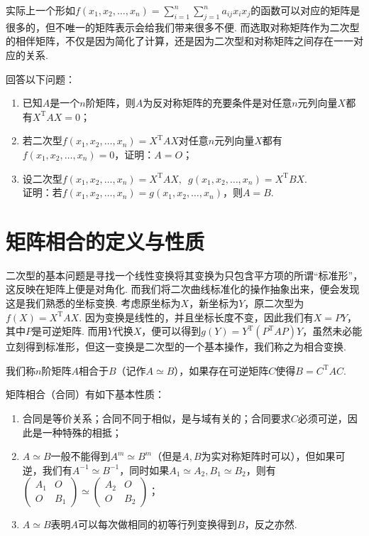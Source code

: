 实际上一个形如$f(x_1,x_2,\ldots,x_n)=\displaystyle\sum_{i=1}^{n}\sum_{j=1}^{n}a_{ij}x_ix_j$的函数可以对应的矩阵是很多的，但不唯一的矩阵表示会给我们带来很多不便. 而选取对称矩阵作为二次型的相伴矩阵，不仅是因为简化了计算，还是因为二次型和对称矩阵之间存在一一对应的关系.

\begin{example}{}{}
    回答以下问题：
    \begin{enumerate}
        \item 已知$A$是一个$n$阶矩阵，则$A$为反对称矩阵的充要条件是对任意$n$元列向量$X$都有$X^\mathrm{T}AX=0$；

        \item 若二次型$f(x_1,x_2,\ldots,x_n)=X^\mathrm{T}AX$对任意$n$元列向量$X$都有$f(x_1,x_2,\ldots,x_n)=0$，证明：$A=O$；

        \item 设二次型$f(x_1,x_2,\ldots,x_n)=X^\mathrm{T}AX,\enspace g(x_1,x_2,\ldots,x_n)=X^\mathrm{T}BX$.\\
              证明：若$f(x_1,x_2,\ldots,x_n)=g(x_1,x_2,\ldots,x_n)$，则$A=B$.
    \end{enumerate}
\end{example}

\section{矩阵相合的定义与性质}

二次型的基本问题是寻找一个线性变换将其变换为只包含平方项的所谓“标准形”，这反映在矩阵上便是对角化. 而我们将二次曲线标准化的操作抽象出来，便会发现这是我们熟悉的坐标变换. 考虑原坐标为$X$，新坐标为$Y$，原二次型为$f(X) = X^\mathrm{T}AX$. 因为变换是线性的，并且坐标长度不变，因此我们有$X=PY$，其中$P$是可逆矩阵. 而用$Y$代换$X$，便可以得到$g(Y) = Y^\mathrm{T}(P^\mathrm{T}AP)Y$，虽然未必能立刻得到标准形，但这一变换是二次型的一个基本操作，我们称之为相合变换.

\begin{definition}{}{}
    我们称$n$阶矩阵$A$相合于$B$（记作$A\simeq B$），如果存在可逆矩阵$C$使得$B=C^\mathrm{T}AC$.
\end{definition}
矩阵相合（合同）有如下基本性质：
\begin{enumerate}
    \item 合同是等价关系；合同不同于相似，是与域有关的；合同要求$C$必须可逆，因此是一种特殊的相抵；

    \item $A\simeq B$一般不能得到$A^m\simeq B^m$（但是$A,B$为实对称矩阵时可以），但如果可逆，我们有$A^{-1}\simeq B^{-1}$，同时如果$A_1\simeq A_2,B_1\simeq B_2$，则有$\begin{pmatrix}
                  A_1 & O \\ O & B_1
              \end{pmatrix}\simeq\begin{pmatrix}
                  A_2 & O \\ O & B_2
              \end{pmatrix}$；

    \item $A\simeq B$表明$A$可以每次做相同的初等行列变换得到$B$，反之亦然.
\end{enumerate}

